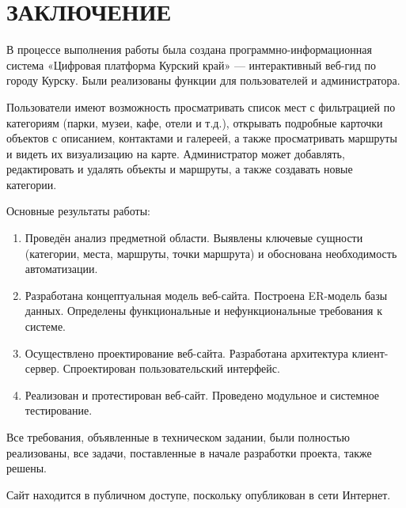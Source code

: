 \section*{ЗАКЛЮЧЕНИЕ}
В процессе выполнения работы была создана программно-информационная система «Цифровая платформа Курский край» — интерактивный веб-гид по городу Курску. Были реализованы функции для пользователей и администратора.

Пользователи имеют возможность просматривать список мест с фильтрацией по категориям (парки, музеи, кафе, отели и т.д.), открывать подробные карточки объектов с описанием, контактами и галереей, а также просматривать маршруты и видеть их визуализацию на карте. Администратор может добавлять, редактировать и удалять объекты и маршруты, а также создавать новые категории.

Основные результаты работы:

\begin{enumerate}
	\item Проведён анализ предметной области. Выявлены ключевые сущности (категории, места, маршруты, точки маршрута) и обоснована необходимость автоматизации.
	\item Разработана концептуальная модель веб-сайта. Построена ER-модель базы данных. Определены функциональные и нефункциональные требования к системе.
	\item Осуществлено проектирование веб-сайта. Разработана архитектура клиент-сервер. Спроектирован пользовательский интерфейс.
	\item Реализован и протестирован веб-сайт. Проведено модульное и системное тестирование.
\end{enumerate}

Все требования, объявленные в техническом задании, были полностью реализованы, все задачи, поставленные в начале разработки проекта, также решены.

Сайт находится в публичном доступе, поскольку опубликован в сети Интернет.  
